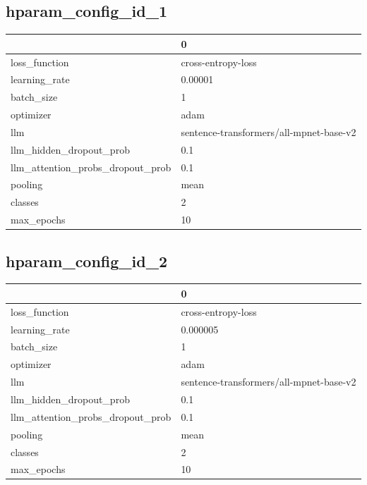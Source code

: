 \documentclass{article}
\begin{document}
\subsection{hparam\_config\_id\_1}
\begin{tabular}{ll}
\toprule
{} &                                        0 \\
\midrule
loss\_function                    &                       cross-entropy-loss \\
learning\_rate                    &                                  0.00001 \\
batch\_size                       &                                        1 \\
optimizer                        &                                     adam \\
llm                              &  sentence-transformers/all-mpnet-base-v2 \\
llm\_hidden\_dropout\_prob          &                                      0.1 \\
llm\_attention\_probs\_dropout\_prob &                                      0.1 \\
pooling                          &                                     mean \\
classes                          &                                        2 \\
max\_epochs                       &                                       10 \\
\bottomrule
\end{tabular}

\subsection{hparam\_config\_id\_2}
\begin{tabular}{ll}
\toprule
{} &                                        0 \\
\midrule
loss\_function                    &                       cross-entropy-loss \\
learning\_rate                    &                                 0.000005 \\
batch\_size                       &                                        1 \\
optimizer                        &                                     adam \\
llm                              &  sentence-transformers/all-mpnet-base-v2 \\
llm\_hidden\_dropout\_prob          &                                      0.1 \\
llm\_attention\_probs\_dropout\_prob &                                      0.1 \\
pooling                          &                                     mean \\
classes                          &                                        2 \\
max\_epochs                       &                                       10 \\
\bottomrule
\end{tabular}
\end{document}
